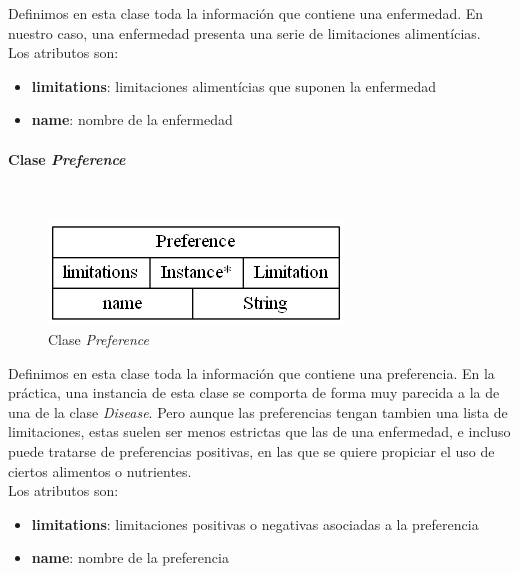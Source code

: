 \documentclass[12]{article}
\begin{document}
Definimos en esta clase toda la información que contiene una enfermedad. En nuestro caso, una enfermedad presenta una serie de limitaciones alimentícias.
\\

Los atributos son: 
\begin{itemize}
\item \textbf{limitations}: limitaciones alimentícias que suponen la enfermedad
\item \textbf{name}: nombre de la enfermedad
\end{itemize}

\vspace{0.5cm}

\paragraph{Clase \emph{Preference}}\mbox{}\\
\begin{figure}[H]
\centering
\includegraphics[scale=0.5]{images/class_Preference.png}
\caption{Clase \emph{Preference}}
\label{fig_class_Preference}
\end{figure}

Definimos en esta clase toda la información que contiene una preferencia. En la práctica, una instancia de esta clase se comporta de forma muy parecida a la de una de la clase \emph{Disease}. Pero aunque las preferencias tengan tambien una lista de limitaciones, estas suelen ser menos estrictas que las de una enfermedad, e incluso puede tratarse de preferencias positivas, en las que se quiere propiciar el uso de ciertos alimentos o nutrientes.
\\

Los atributos son: 
\begin{itemize}
\item \textbf{limitations}: limitaciones positivas o negativas asociadas a la preferencia
\item \textbf{name}: nombre de la preferencia
\end{itemize}

\vspace{0.5cm}
\end{document}
